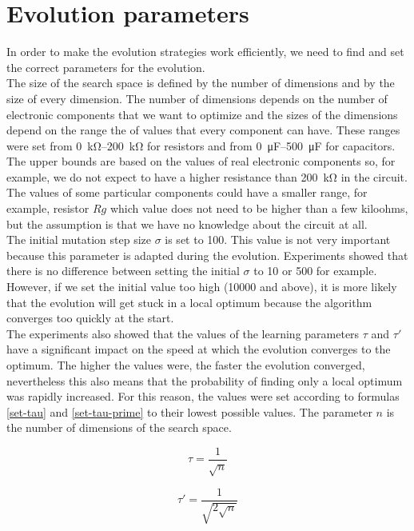 \section{Evolution parameters}
In order to make the evolution strategies work efficiently, we need to find and set the correct parameters for the evolution.\\
The size of the search space is defined by the number of dimensions and by the size of every dimension. The number of dimensions depends on the number of electronic components that we want to optimize and the sizes of the dimensions depend on the range the of values that every component can have. These ranges were set from \SIrange{0}{200}{\kilo\ohm} for resistors and from \SIrange{0}{500}{\micro\farad} for capacitors. The upper bounds are based on the values of real electronic components so, for example, we do not expect to have a higher resistance than \SI{200}{\kilo\ohm} in the circuit. The values of some particular components could have a smaller range, for example, resistor $Rg$ which value does not need to be higher than a few kiloohms, but the assumption is that we have no knowledge about the circuit at all.\\
The initial mutation step size $\sigma$ is set to 100. This value is not very important because this parameter is adapted during the evolution. Experiments showed that there is no difference between setting the initial $\sigma$ to 10 or 500 for example. However, if we set the initial value too high (10000 and above), it is more likely that the evolution will get stuck in a local optimum because the algorithm converges too quickly at the start.\\
The experiments also showed that the values of the learning parameters $\tau$ and $\tau'$ have a significant impact on the speed at which the evolution converges to the optimum. The higher the values were, the faster the evolution converged, nevertheless this also means that the probability of finding only a local optimum was rapidly increased. For this reason, the values were set according to formulas \ref{set-tau} and \ref{set-tau-prime} to their lowest possible values. The parameter $n$ is the number of dimensions of the search space.

\begin{equation} \label{set-tau}
    \tau = \frac{1}{\sqrt{n}}
\end{equation}

\begin{equation} \label{set-tau-prime}
    \tau' = \frac{1}{\sqrt{2\sqrt{n}}}
\end{equation}

